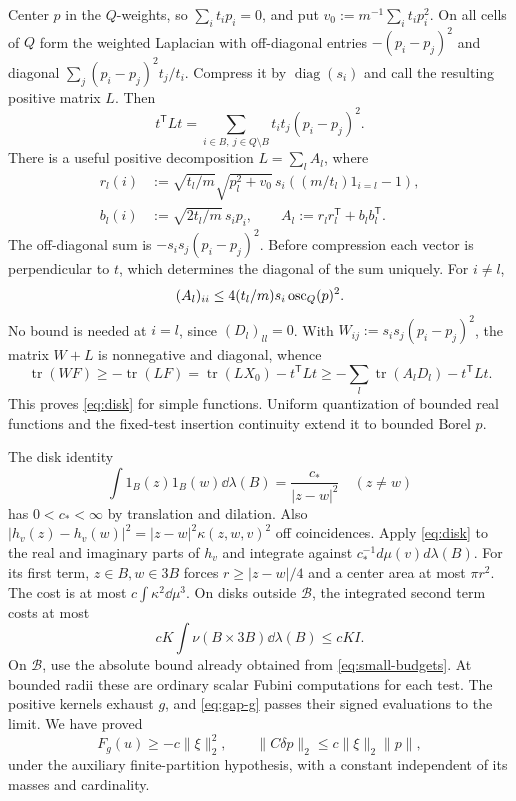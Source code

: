 Center $p$ in the $Q$-weights, so $\sum_it_ip_i=0$, and put $v_0:=m^{-1}\sum_it_ip_i^2$.
On all cells of $Q$ form the weighted Laplacian with off-diagonal entries $-(p_i-p_j)^2$ and diagonal $\sum_j(p_i-p_j)^2t_j/t_i$.
Compress it by $\operatorname{diag}(s_i)$ and call the resulting positive matrix $L$.
Then
\[
 t^{\mathsf T}Lt=\sum_{i\in B,\ j\in Q\setminus B}t_it_j(p_i-p_j)^2.
\]
There is a useful positive decomposition $L=\sum_lA_l$, where
\begin{align*}
 r_l(i)&:=\sqrt{t_l/m}\sqrt{p_l^2+v_0}\,s_i((m/t_l)1_{i=l}-1),\\
 b_l(i)&:=\sqrt{2t_l/m}\,s_ip_i,\qquad
 A_l:=r_lr_l^{\mathsf T}+b_lb_l^{\mathsf T}.
\end{align*}
The off-diagonal sum is $-s_is_j(p_i-p_j)^2$.
Before compression each vector is perpendicular to $t$, which determines the diagonal of the sum uniquely.
For $i\ne l$,
\[
 (A_l)_{ii}\le4(t_l/m)s_i\operatorname{osc}_Q(p)^2.
\]
No bound is needed at $i=l$, since $(D_l)_{ll}=0$.
With $W_{ij}:=s_is_j(p_i-p_j)^2$, the matrix $W+L$ is nonnegative and diagonal, whence
\[
 \operatorname{tr}(WF)\ge-\operatorname{tr}(LF)
 =\operatorname{tr}(LX_0)-t^{\mathsf T}Lt
 \ge-\sum_l\operatorname{tr}(A_lD_l)-t^{\mathsf T}Lt.
\]
This proves \eqref{eq:disk} for simple functions.
Uniform quantization of bounded real functions and the fixed-test insertion continuity extend it to bounded Borel $p$.

The disk identity
\[
 \int1_B(z)1_B(w)\dd\lambda(B)=\frac{c_*}{|z-w|^2}\quad(z\ne w)
\]
has $0<c_*<\infty$ by translation and dilation.
Also $|h_v(z)-h_v(w)|^2=|z-w|^2\kappa(z,w,v)^2$ off coincidences.
Apply \eqref{eq:disk} to the real and imaginary parts of $h_v$ and integrate against $c_*^{-1}d\mu(v)d\lambda(B)$.
For its first term, $z\in B,w\in3B$ forces $r\ge|z-w|/4$ and a center area at most $\pi r^2$.
The cost is at most $c\int\kappa^2\dd\mu^3$.
On disks outside $\mathcal B$, the integrated second term costs at most
\[
 cK\int\nu(B\times3B)\dd\lambda(B)\le cKI.
\]
On $\mathcal B$, use the absolute bound already obtained from \eqref{eq:small-budgets}.
At bounded radii these are ordinary scalar Fubini computations for each test.
The positive kernels exhaust $g$, and \eqref{eq:gap-g} passes their signed evaluations to the limit.
We have proved
\begin{equation}\label{eq:partition-bound}
 F_g(u)\ge-c\|\xi\|_2^2,\qquad
 \|C\delta p\|_2\le c\|\xi\|_2\|p\|,
\end{equation}
under the auxiliary finite-partition hypothesis, with a constant independent of its masses and cardinality.

